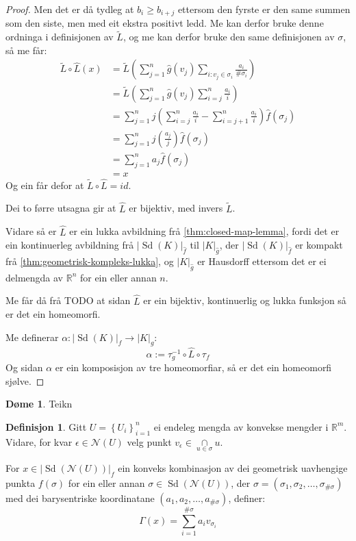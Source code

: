 \documentclass[a4paper, titlepage, 12pt, norsk]{article}
\theoremstyle{plain}
\theoremstyle{definition}
\newtheorem{definition}[theorem]{Definisjon}
\newtheorem{example}[theorem]{Døme}
\newcommand{\Rb}{\mathbb{R}}
\newcommand{\Nc}{\mathcal{N}}
\newcommand{\intersect}{ \mathop{\cap}\limits } %
\newcommand{\gr}[1]{ \lvert #1 \rvert } %
\newcommand{\set}[1]{ \left \{ #1 \right \} } %
\newcommand{\tuple}[1]{ \left( #1 \right) } %
\DeclareMathOperator{\Sd}{Sd}
\begin{document}
\begin{proof}
	Men det er då tydleg at \( b_i \geq b_{i+j} \) ettersom den fyrste er den same summen som den siste, men med eit ekstra positivt ledd. Me kan derfor bruke denne ordninga i definisjonen av \( \tilde{L} \), og me kan derfor bruke den same definisjonen av \( \sigma \), så me får:
	\begin{align*}
		\tilde{L}\circ\hat{L}(x) &= \tilde{L}\tuple{\sum_{j=1}^n \hat{g}(v_j) \sum_{i:v_j\in\sigma_i}\frac{a_i}{\#\sigma_i}} \\
		&= \tilde{L}\tuple{\sum_{j=1}^n \hat{g}(v_j) \sum_{i=j}^n \frac{a_i}{i}} \\
		&= \sum_{j=1}^n j\tuple{\sum_{i=j}^n \frac{a_i}{i} - \sum_{i=j+1}^n \frac{a_i}{i}}\hat{f}(\sigma_j) \\
		&= \sum_{j=1}^n j\tuple{\frac{a_j}{j}}\hat{f}(\sigma_j) \\
		&= \sum_{j=1}^n a_j \hat{f}(\sigma_j) \\
		&= x
	\end{align*}
	Og ein får defor at \( \tilde{L}\circ\hat{L} = id \). 
	
	Dei to førre utsagna gir at \( \hat{L} \) er bijektiv, med invers \( \tilde{L} \).

	Vidare så er \( \hat{L} \) er ein lukka avbildning frå \autoref{thm:closed-map-lemma}, fordi det er ein kontinuerleg avbildning frå \( \gr{\Sd(K)}_{\hat{f}} \) til \( \gr{K}_{\hat{g}} \), der \( \gr{\Sd(K)}_{\hat{f}} \) er kompakt frå \autoref{thm:geometrisk-kompleks-lukka}, og  \( \gr{K}_{\hat{g}} \) er Hausdorff ettersom det er ei delmengda av \( \Rb^n \) for ein eller annan \( n \).

	Me får då frå TODO at sidan \( \hat{L} \) er ein bijektiv, kontinuerlig og lukka funksjon så er det ein homeomorfi.

	Me definerar \( \alpha: \gr{\Sd(K)}_f \to \gr{K}_g \):
	\[
		\alpha := \tau_g^{-1} \circ \hat{L} \circ \tau_f
	\]
	Og sidan \( \alpha \) er ein komposisjon av tre homeomorfiar, så er det ein homeomorfi sjølve.
\end{proof}

\begin{example}
	Teikn
\end{example}

\begin{definition} \label{thm:Gamma} %
	Gitt \( U = \set{U_i}_{i=1}^n \) ei endeleg mengda av konvekse mengder i \( \Rb^m \). Vidare, for kvar \( \epsilon \in \Nc(U) \) velg punkt \( v_\epsilon \in \intersect_{u \in \sigma} u \).

	For \( x \in \gr{\Sd(\Nc(U))}_f \) ein konveks kombinasjon av dei geometrisk uavhengige punkta \( f(\sigma) \) for ein eller annan \( \sigma \in \Sd(\Nc(U)) \), der \( \sigma = \tuple{\sigma_1, \sigma_2, \dots, \sigma_{\#\sigma}} \) med dei barysentriske koordinatane \( \tuple{a_1, a_2, \dots, a_{\#\sigma}} \), definer:
	\[
		\Gamma(x) = \sum_{i=1}^{\#\sigma} a_i v_{\sigma_i}
	\]
\end{definition}
\end{document}
